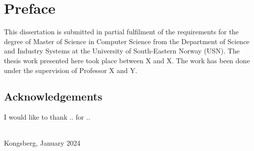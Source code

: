 \chapter*{Preface}
\label{sec:preface}
This dissertation is submitted in partial fulfilment of the requirements for the degree of Master of Science in Computer Science from the Department of Science and Industry Systems at the University of South-Eastern Norway (USN). The thesis work presented here took place between X and X. The work has been done under the supervision of Professor X and Y.





\section*{Acknowledgements}
I would like to thank .. for ..

\textbf{\myauthor} \\
Kongsberg, January 2024